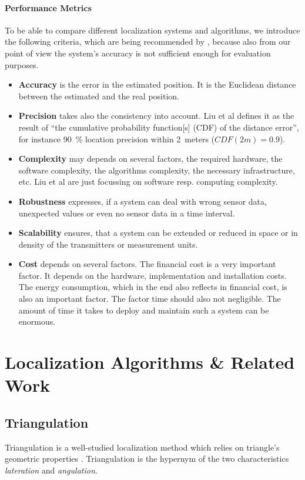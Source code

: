 \paragraph{Performance Metrics}
To be able to compare different localization systems and algorithms, we introduce the following criteria, which are being recommended by \citet{IEEE:survey_wireless_indoor_pos}, because also from our point of view the system's accuracy is not sufficient enough for evaluation purposes.
\begin{itemize}
	\item \textbf{Accuracy} is the error in the estimated position. It is the Euclidean distance between the estimated and the real position.
	\item \textbf{Precision} takes also the consistency into account. Liu et al defines it as the result of ``the cumulative probability function[s] (CDF) of the distance error'', for instance 90~\% location precision within 2~meters ($CDF(2m) = 0.9$).
	\item \textbf{Complexity} may depends on several factors, the required hardware, the software complexity, the algorithms complexity, the necessary infrastructure, etc. Liu et al are just focussing on software resp. computing complexity.
	\item \textbf{Robustness} expresses, if a system can deal with wrong sensor data, unexpected values or even no sensor data in a time interval.
	\item \textbf{Scalability} ensures, that a system can be extended or reduced in space or in density of the transmitters or measurement units.
	\item \textbf{Cost} depends on several factors. The financial cost is a very important factor. It depends on the hardware, implementation and installation costs. The energy consumption, which in the end also reflects in financial cost, is also an important factor. The factor time should also not negligible. The amount of time it takes to deploy and maintain such a system can be enormous.
\end{itemize}


\section{Localization Algorithms \& Related Work}

\subsection{Triangulation}
Triangulation is a well-studied localization method which relies on triangle's geometric properties \citep{IEEE:survey_wireless_indoor_pos, wang:bt_pos}. Triangulation is the hypernym of the two characteristics \emph{lateration} and \emph{angulation}.

